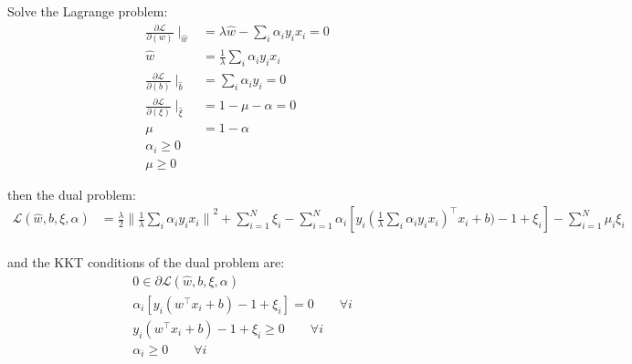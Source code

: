 \documentclass[a4paper]{article}
\begin{document}
Solve the Lagrange problem:
\begin{equation}
    \begin{aligned}
        \frac{\partial \mathcal{L}}{\partial(w)}\mid_{\hat{w}} &= \lambda \hat{w} - \sum_{i} \alpha_i y_i x_i = 0\\
        \hat{w} &= \frac{1}{\lambda} \sum_{i} \alpha_i y_i x_i \\
        \frac{\partial \mathcal{L}}{\partial(b)}\mid_{\hat{b}} &= \sum_{i} \alpha_i y_i = 0 \\
        \frac{\partial \mathcal{L}}{\partial(\xi)}\mid_{\hat{\xi}} &= 1 - \mu - \alpha= 0 \\
        \mu & = 1- \alpha \\
        \alpha_i \ge 0\\
        \mu \ge 0
    \end{aligned}
\end{equation}


then the dual problem:
\begin{equation}
    \begin{aligned}
        \mathcal{L}(\hat{w},b,\xi,\alpha)  &= \frac{\lambda}{2}{\| \frac{1}{\lambda} \sum_{i} \alpha_i y_i x_i \|}^2 + \sum_{i=1}^{N} \xi_i - \sum_{i=1}^{N} \alpha_i [y_i (\frac{1}{\lambda} \sum_{i} \alpha_i y_i x_i )^{\top} x_i + b) - 1+\xi_i] - \sum_{i=1}^{N} \mu_i \xi_i \\
    \end{aligned}
\end{equation}


and the KKT conditions of the dual problem are:
\begin{equation}
    \begin{aligned}
        & 0 \in \partial \mathcal{L}(\hat{w},b,\xi,\alpha) \\
        &\alpha_i [y_i(w^{\top} x_i + b) - 1+\xi_i] =0 \qquad \forall i \\
        & y_i(w^{\top} x_i + b) - 1+\xi_i \ge 0 \qquad \forall i\\
        & \alpha_i \ge 0 \qquad \forall i\\
    \end{aligned}
\end{equation}
\end{document}
